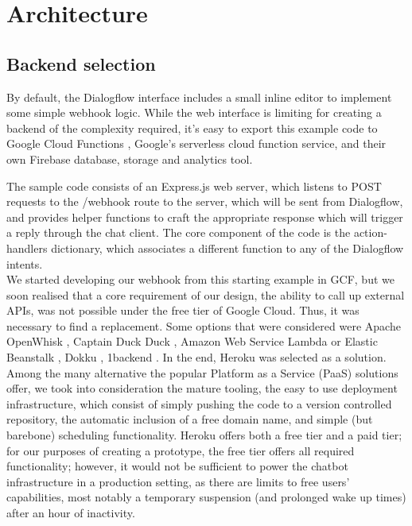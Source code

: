 \documentclass{article}
\begin{document}
\section*{Architecture}
\subsection*{Backend selection}
By default, the Dialogflow interface includes a small inline editor to implement some simple webhook logic. While the web interface is limiting for creating a backend of the complexity required, it's easy to export this example code to Google Cloud Functions \cite{gcfwebsite}, Google's serverless cloud function service, and their own Firebase database, storage and analytics tool. 

The sample code consists of an Express.js \cite{expresswebsite} web server, which listens to POST requests to the /webhook route to the server, which will be sent from Dialogflow, and provides helper functions to craft the appropriate response which will trigger a reply through the chat client. The core component of the code is the action-handlers dictionary, which associates a different function to any of the Dialogflow intents. \\

We started developing our webhook from this starting example in GCF, but we soon realised that a core requirement of our design, the ability to call up external APIs, was not possible under the free tier of Google Cloud. Thus, it was necessary to find a replacement. Some options that were considered were Apache OpenWhisk \cite{apacheopenwhisk}, Captain Duck Duck \cite{captainduckduck}, Amazon Web Service Lambda or Elastic Beanstalk \cite{awsproductwebsite}, Dokku \cite{dokku}, 1backend \cite{1backend}. In the end, Heroku was selected as a solution. Among the many alternative the popular Platform as a Service (PaaS) solutions offer, we took into consideration the mature tooling, the easy to use deployment infrastructure, which consist of simply pushing the code to a version controlled repository, the automatic inclusion of a free domain name, and simple (but barebone) scheduling functionality. Heroku offers both a free tier and a paid tier; for our purposes of creating a prototype, the free tier offers all required functionality; however, it would not be sufficient to power the chatbot infrastructure in a production setting, as there are limits to free users' capabilities, most notably a temporary suspension (and prolonged wake up times) after an hour of inactivity.
\end{document}
